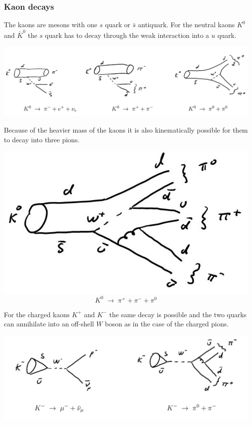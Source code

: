 \documentclass[12pt]{article}
\begin{document}
\subsubsection{Kaon decays}
The kaons are mesons with one $s$ quark or $\bar s$ antiquark. For the neutral kaons $K^0$ and $\bar K^0$  the $s$ quark has to decay through the weak interaction into a $u$ quark. 
\begin{center}
\includegraphics[scale=0.15]{images/k0decay.png}
\end{center}
Because of the heavier mass of the kaons it is also kinematically possible for them to decay into three pions.
\begin{center}
\includegraphics[scale=0.2]{images/K0Decay3.png}
\[
K^0\;\rightarrow\; \pi^+ +\pi^-+\pi^0
\]
\end{center}
For the charged kaons $K^+$ and $K^-$ the same decay is possible and the two quarks can annihilate into an off-shell $W$ boson as in the case of the charged pions.  
\begin{center}
\includegraphics[scale=0.25]{images/kaonWeak.png}
\end{center}
\end{document}
